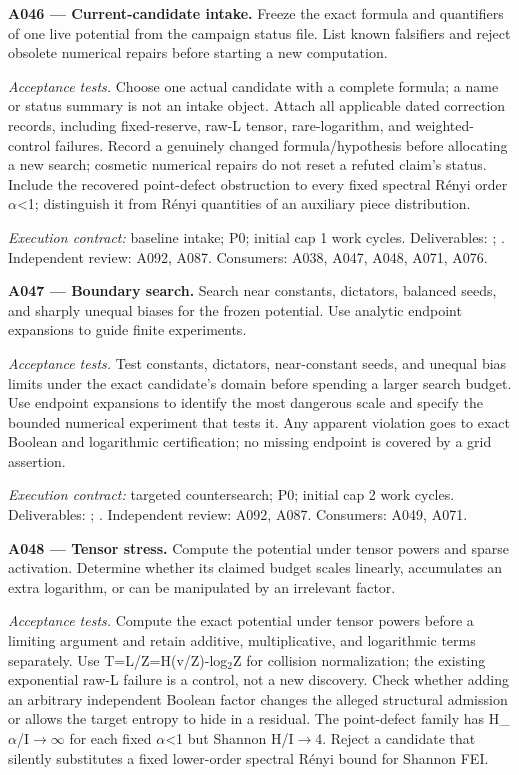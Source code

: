\documentclass[11pt]{article}
\begin{document}
\textbf{A046 --- Current-candidate intake.} Freeze the exact formula and quantifiers of one live potential from the campaign status file. List known falsifiers and reject obsolete numerical repairs before starting a new computation.

\emph{Acceptance tests.} Choose one actual candidate with a complete formula; a name or status summary is not an intake object. Attach all applicable dated correction records, including fixed-reserve, raw-L tensor, rare-logarithm, and weighted-control failures. Record a genuinely changed formula/hypothesis before allocating a new search; cosmetic numerical repairs do not reset a refuted claim's status. Include the recovered point-defect obstruction to every fixed spectral R\'{e}nyi order $\alpha$<1; distinguish it from R\'{e}nyi quantities of an auxiliary piece distribution.

{\small\emph{Execution contract:} baseline intake; P0; initial cap 1 work cycles. Deliverables: ; . Independent review: A092, A087. Consumers: A038, A047, A048, A071, A076.}

\textbf{A047 --- Boundary search.} Search near constants, dictators, balanced seeds, and sharply unequal biases for the frozen potential. Use analytic endpoint expansions to guide finite experiments.

\emph{Acceptance tests.} Test constants, dictators, near-constant seeds, and unequal bias limits under the exact candidate's domain before spending a larger search budget. Use endpoint expansions to identify the most dangerous scale and specify the bounded numerical experiment that tests it. Any apparent violation goes to exact Boolean and logarithmic certification; no missing endpoint is covered by a grid assertion.

{\small\emph{Execution contract:} targeted countersearch; P0; initial cap 2 work cycles. Deliverables: ; . Independent review: A092, A087. Consumers: A049, A071.}

\textbf{A048 --- Tensor stress.} Compute the potential under tensor powers and sparse activation. Determine whether its claimed budget scales linearly, accumulates an extra logarithm, or can be manipulated by an irrelevant factor.

\emph{Acceptance tests.} Compute the exact potential under tensor powers before a limiting argument and retain additive, multiplicative, and logarithmic terms separately. Use T=L/Z=H(v/Z)-log$_2$Z for collision normalization; the existing exponential raw-L failure is a control, not a new discovery. Check whether adding an arbitrary independent Boolean factor changes the alleged structural admission or allows the target entropy to hide in a residual. The point-defect family has H\_$\alpha$/I$\to$$\infty$ for each fixed $\alpha$<1 but Shannon H/I$\to$4. Reject a candidate that silently substitutes a fixed lower-order spectral R\'{e}nyi bound for Shannon FEI.
\end{document}
